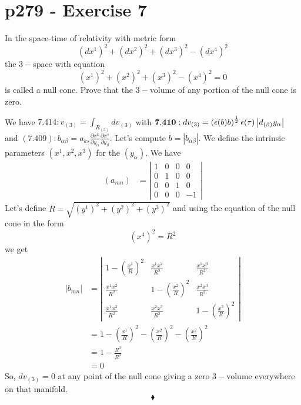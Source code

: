 \section{p279 - Exercise 7}
\begin{tcolorbox}
In the space-time of relativity with metric form
$$\left ( dx^1\right)^2+\left( dx^2\right)^2+\left ( dx^3\right)^2-\left( dx^4\right)^2$$
the $3-$space with equation 
$$\left (x^1\right)^2+\left( x^2\right)^2+\left( x^3\right)^2-\left( x^4\right)^2=0$$
is called a null cone. Prove that the $3-$volume of any portion of the null cone is zero.
\end{tcolorbox}
We have $\mathbf{7.414}: v_{(3)} = \int_{R_{(3)}} dv_{(3)} $  with $\mathbf{7.410}: dv_{(3)}= \left(\epsilon(b)b\right)^{\frac{1}{2}}\epsilon(\tau)\left | d_{(\beta)}y_{\alpha}\right |$ \\
and $\mathbf{(7.409)}: b_{\alpha \beta }= a_{ks}\frac{\partial x^k}{\partial y_{\alpha}}\frac{\partial x^s}{\partial y_{\beta}}$. Let's compute $b=\left | b_{\alpha \beta }\right|$. We define the intrinsic parameters $\left(x^1, x^2,x^3\right)$ for the $\left( y_{\alpha}\right)$.
We have 
\begin{align}
\left(a_{mn}\right)&=\left |\begin{matrix}
1&0&0&0\\
0&1&0&0\\
0&0&1&0\\
0&0&0&-1
\end{matrix}\right |
\end{align}
Let's define $R=\sqrt{\left (y^1\right)^2+\left( y^2\right)^2+\left( y^3\right)^2}$ and using the equation of the null cone in the form $$\left(x^4\right)^2 = R^2$$ we get
\begin{align}
\left|b_{mn}\right|&=\left |\begin{matrix}
1-\left(\frac{x^1}{R}\right)^2&\frac{x^1 x^2}{R^2}&\frac{x^1 x^3}{R^2}\\
\frac{x^1 x^2}{R^2}&1-\left(\frac{x^2}{R}\right)^2&\frac{x^2 x^3}{R^2}\\
\frac{x^1 x^3}{R^2}&\frac{x^2 x^3}{R^2}&1-\left(\frac{x^3}{R}\right)^2
\end{matrix}\right |\\
&= 1-\left(\frac{x^1}{R}\right)^2-\left(\frac{x^2}{R}\right)^2-\left(\frac{x^2}{R}\right)^2\\
&= 1 -\frac{R^2}{R^2}\\
&=0
\end{align}
So, $dv_{(3)}=0$ at any point of the null cone giving a zero $3-$volume everywhere on that manifold.
$$\blacklozenge$$
\newpage

